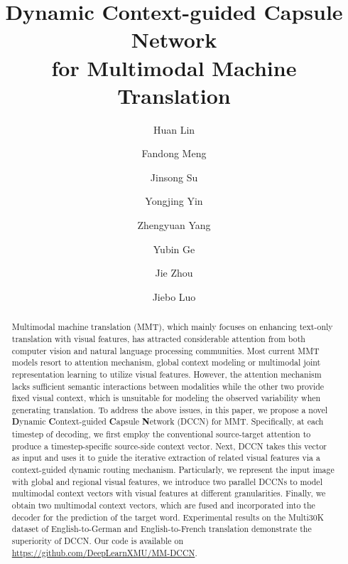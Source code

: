 \documentclass[sigconf]{acmart}
\begin{document}
\fancyhead{}
\title{Dynamic Context-guided Capsule Network \\ for Multimodal Machine Translation}




\author{Huan Lin}

\author{Fandong Meng}

\author{Jinsong Su}

\author{Yongjing Yin}

\author{Zhengyuan Yang}

\author{Yubin Ge}

\author{Jie Zhou}

\author{Jiebo Luo}


\renewcommand{\shortauthors}{Lin, et al.}




\begin{abstract}
Multimodal machine translation (MMT), which mainly focuses on enhancing text-only translation with visual features, has attracted considerable attention from both computer vision and natural language processing communities. 
Most current MMT models resort to attention mechanism, global context modeling or multimodal joint representation learning to utilize visual features. However, the attention mechanism lacks sufficient semantic interactions between modalities while the other two provide fixed visual context, which is unsuitable for modeling the observed variability when generating translation. 
To address the above issues, in this paper, we propose a novel \textbf{D}ynamic \textbf{C}ontext-guided \textbf{C}apsule \textbf{N}etwork (DCCN) for MMT.  Specifically, at each timestep of decoding, we first employ the conventional source-target attention to produce a  timestep-specific source-side context vector. Next, DCCN takes this vector as input and uses it to guide the iterative extraction of related visual features via a context-guided dynamic routing mechanism. Particularly, we represent the input image with global and regional visual features, we introduce two parallel DCCNs to model multimodal context vectors with visual features at different granularities. Finally, we obtain two multimodal context vectors, which are fused and incorporated into the decoder for the prediction of the target word.
Experimental results on the Multi30K dataset of English-to-German and English-to-French translation demonstrate the superiority of DCCN. 
Our code is available on \url{https://github.com/DeepLearnXMU/MM-DCCN}.
\end{abstract}
\end{document}
